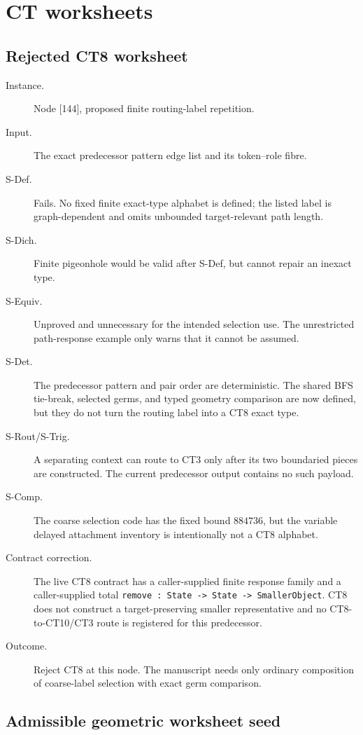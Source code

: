 \documentclass[11pt]{article}
\begin{document}
\section{CT worksheets}

\subsection*{Rejected CT8 worksheet}

\begin{description}
\item[Instance.] Node [144], proposed finite routing-label repetition.
\item[Input.] The exact predecessor pattern edge list and its token--role
fibre.
\item[S-Def.] Fails.  No fixed finite exact-type alphabet is defined; the
listed label is graph-dependent and omits unbounded target-relevant path
length.
\item[S-Dich.] Finite pigeonhole would be valid after S-Def, but cannot repair
an inexact type.
\item[S-Equiv.] Unproved and unnecessary for the intended selection use.  The
unrestricted path-response example only warns that it cannot be assumed.
\item[S-Det.] The predecessor pattern and pair order are deterministic.  The
shared BFS tie-break, selected germs, and typed geometry comparison are now
defined, but they do not turn the routing label into a CT8 exact type.
\item[S-Rout/S-Trig.] A separating context can route to CT3 only after its two
boundaried pieces are constructed.  The current predecessor output contains
no such payload.
\item[S-Comp.] The coarse selection code has the fixed bound $884736$, but the
variable delayed attachment inventory is intentionally not a CT8 alphabet.
\item[Contract correction.] The live CT8 contract has a caller-supplied finite
response family and a caller-supplied total
\texttt{remove : State -> State -> SmallerObject}.  CT8 does not construct a
target-preserving smaller representative and no CT8-to-CT10/CT3 route is
registered for this predecessor.
\item[Outcome.] Reject CT8 at this node.  The manuscript needs only ordinary
composition of coarse-label selection with exact germ comparison.
\end{description}

\subsection*{Admissible geometric worksheet seed}
\end{document}

